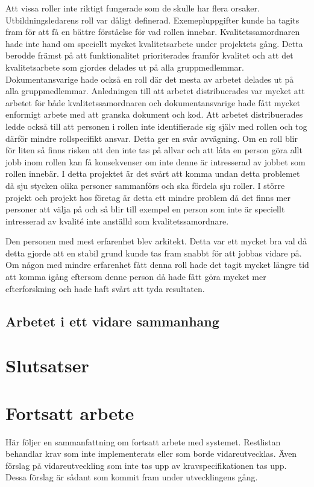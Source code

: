 \documentclass{article}
\begin{document}
Att vissa roller inte riktigt fungerade som de skulle har flera orsaker. Utbildningsledarens roll var dåligt definerad. Exemepluppgifter kunde ha tagits fram för att få en bättre förståelse för vad rollen innebar. Kvalitetssamordnaren hade inte hand om speciellt mycket kvalitetsarbete under projektets gång. Detta berodde främst på att funktionalitet prioriterades framför kvalitet och att det kvalitetsarbete som gjordes delades ut på alla gruppmedlemmar. Dokumentansvarige hade också en roll där det mesta av arbetet delades ut på alla gruppmedlemmar. Anledningen till att arbetet distribuerades var mycket att arbetet för både kvalitetssamordnaren och dokumentansvarige hade fått mycket enformigt arbete med att granska dokument och kod. Att arbetet distribuerades ledde också till att personen i rollen inte identifierade sig själv med rollen och tog därför mindre rollspecifikt ansvar. Detta ger en svår avvägning. Om en roll blir för liten så finns risken att den inte tas på allvar och att låta en person göra allt jobb inom rollen kan få konsekvenser om inte denne är intresserad av jobbet som rollen innebär. I detta projektet är det svårt att komma undan detta problemet då sju stycken olika personer sammanförs och ska fördela sju roller. I större projekt och projekt hos företag är detta ett mindre problem då det finns mer personer att välja på och så blir till exempel en person som inte är speciellt intresserad av kvalité inte anställd som kvalitetssamordnare. 

Den personen med mest erfarenhet blev arkitekt. Detta var ett mycket bra val då detta gjorde att en stabil grund kunde tas fram snabbt för att jobbas vidare på. Om någon med mindre erfarenhet fått denna roll hade det tagit mycket längre tid att komma igång eftersom denne person då hade fått göra mycket mer efterforskning och hade haft svårt att tyda resultaten. 

\subsection{Arbetet i ett vidare sammanhang}

\section{Slutsatser}

\section{Fortsatt arbete}
Här följer en sammanfattning om fortsatt arbete med systemet. Restlistan behandlar krav som inte implementerats eller som borde vidareutvecklas. Även förslag på vidareutveckling som inte tas upp av kravspecifikationen tas upp. Dessa förslag är sådant som kommit fram under utvecklingens gång.
\end{document}
